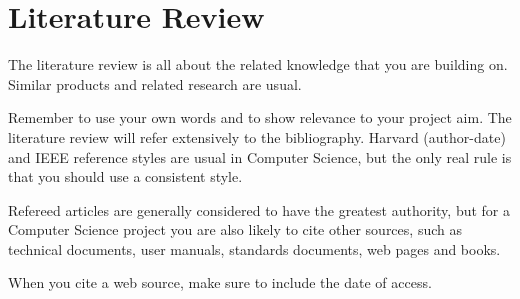 \chapter{Literature Review}

The literature review is all about the related knowledge that you are building on.  Similar products and related research are usual.

Remember to use your own words and to show relevance to your project aim.
The literature review will refer extensively to the bibliography. Harvard (author-date) and IEEE reference styles are usual in Computer Science, but the only real rule is that you should use a consistent style.

Refereed articles are generally considered to have the greatest authority, but for a Computer Science project you are also likely to cite other sources, such as technical documents, user manuals, standards documents, web pages and books.

When you cite a web source, make sure to include the date of access.